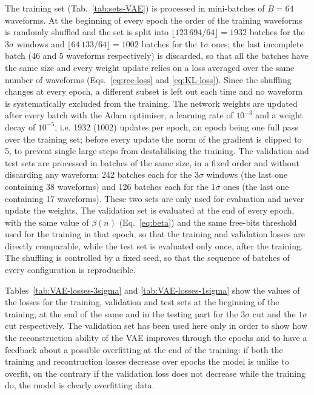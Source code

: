 The training set (Tab.~\ref{tab:sets-VAE}) is processed in mini-batches of $B = 64$ waveforms. At the beginning of every epoch the order of the training waveforms is randomly shuffled and the set is split into $\lfloor 123\,694 / 64 \rfloor = 1932$ batches for the $3\sigma$ windows and $\lfloor 64\,133 / 64 \rfloor = 1002$ batches for the $1\sigma$ ones; the last incomplete batch (46 and 5 waveforms respectively) is discarded, so that all the batches have the same size and every weight update relies on a loss averaged over the same number of waveforms (Eqs.~\ref{eq:rec-loss} and \ref{eq:KL-loss}). Since the shuffling changes at every epoch, a different subset is left out each time and no waveform is systematically excluded from the training. The network weights are updated after every batch with the Adam optimiser, a learning rate of $10^{-3}$ and a weight decay of $10^{-5}$, i.e. 1932 (1002) updates per epoch, an epoch being one full pass over the training set; before every update the norm of the gradient is clipped to 5, to prevent single large steps from destabilising the training. The validation and test sets are processed in batches of the same size, in a fixed order and without discarding any waveform: 242 batches each for the $3\sigma$ windows (the last one containing 38 waveforms) and 126 batches each for the $1\sigma$ ones (the last one containing 17 waveforms). These two sets are only used for evaluation and never update the weights. The validation set is evaluated at the end of every epoch, with the same value of $\beta(n)$ (Eq.~\ref{eq:beta}) and the same free-bits threshold used for the training in that epoch, so that the training and validation losses are directly comparable, while the test set is evaluated only once, after the training. The shuffling is controlled by a fixed seed, so that the sequence of batches of every configuration is reproducible.

Tables~\ref{tab:VAE-losses-3sigma} and \ref{tab:VAE-losses-1sigma} show the values of the losses for the training, validation and test sets at the beginning of the training, at the end of the same and in the testing part for the $3\sigma$ cut and the $1\sigma$ cut respectively. The validation set has been used here only in order to show how the reconstruction ability of the \ac{VAE} improves through the epochs and to have a feedback about a possible overfitting at the end of the training: if both the training and recontruction losses decrease over epochs the model is unlike to overfit, on the contrary if the validation loss does not decrease while the training do, the model is clearly overfitting data.

